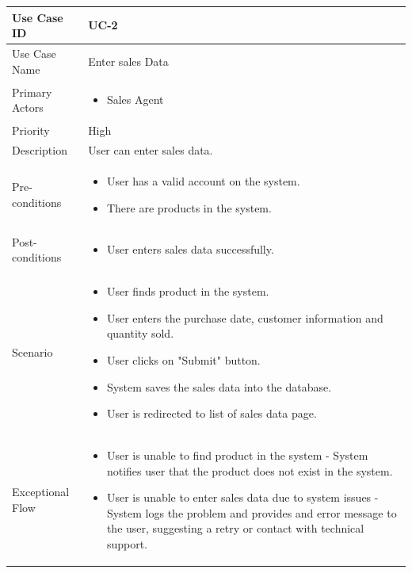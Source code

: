 \vspace{12pt}

\begin{tabularx}{\textwidth}{|l|X|}
\hline
Use Case ID & UC-2 \\
\hline
Use Case Name & Enter sales Data\\
\hline
Primary Actors & 
\begin{itemize}
    \item Sales Agent
\end{itemize} \\
\hline
Priority & High \\
\hline
Description & User can enter sales data. \\
\hline
Pre-conditions & 
\begin{itemize}
    \item User has a valid account on the system.
    \item There are products in the system.
\end{itemize} \\
\hline
Post-conditions & 
\begin{itemize}
    \item User enters sales data successfully.
\end{itemize} \\
\hline
Scenario & 
\begin{itemize}
    \item User finds product in the system. 
    \item User enters the purchase date, customer information and quantity sold.
    \item User clicks on "Submit" button.
    \item System saves the sales data into the database. 
    \item User is redirected to list of sales data page.
\end{itemize}\\
\hline
Exceptional Flow & 
\begin{itemize}
    \item User is unable to find product in the system - System notifies user that the product does not exist in the system.
    \item User is unable to enter sales data due to system issues - System logs the problem and provides and error message to the user, suggesting a retry or contact with technical support.
\end{itemize}\\
\hline
\end{tabularx}

